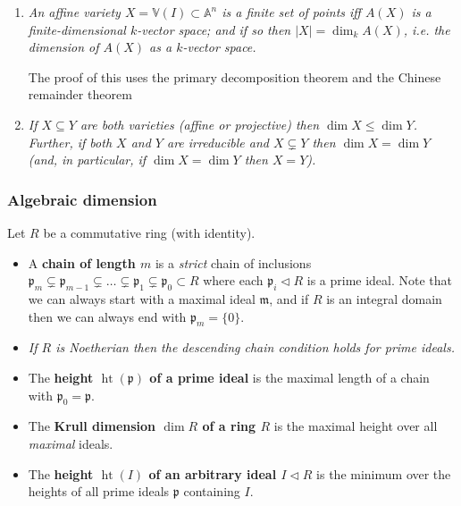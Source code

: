 \documentclass[10pt]{article}
\newcommand{\van}{\mathbb{V}}
\newcommand{\aff}{\mathbb{A}}
\newcommand{\prid}{\mathfrak{p}}
\newcommand{\maid}{\mathfrak{m}}
\DeclareMathOperator{\height}{ht}
\begin{document}
                \begin{enumerate}
                    \item \emph{An affine variety $X=\van(I)\subset\aff^n$ is a finite set of points iff $A(X)$ is a finite-dimensional $k$-vector space; and if so then $|X|=\dim_k A(X)$, i.e. the dimension of $A(X)$ as a $k$-vector space.}

                        The proof of this uses the primary decomposition theorem and the Chinese remainder theorem
                    \item \emph{If $X\subseteq Y$ are both varieties (affine or projective) then $\dim X\leqslant\dim Y$.}
                        \emph{Further, if both $X$ and $Y$ are irreducible and $X\subsetneq Y$ then $\dim X=\dim Y$ (and, in particular, if $\dim X=\dim Y$ then $X=Y$).}
                \end{enumerate}

            \subsubsection{Algebraic dimension}

                Let $R$ be a commutative ring (with identity).

                \begin{itemize}
                    \item A \textbf{chain of length $m$} is a \emph{strict} chain of inclusions $\prid_m\subsetneq\prid_{m-1}\subsetneq\ldots\subsetneq\prid_1\subsetneq\prid_0\subset R$ where each $\prid_i\triangleleft R$ is a prime ideal.
                        Note that we can always start with a maximal ideal $\maid$, and if $R$ is an integral domain then we can always end with $\prid_m=\{0\}$.
                    \item \emph{If $R$ is Noetherian then the descending chain condition holds for \emph{prime} ideals.}
                    \item The \textbf{height $\height(\prid)$ of a prime ideal} is the maximal length of a chain with $\prid_0=\prid$.
                    \item The \textbf{Krull dimension $\dim R$ of a ring $R$} is the maximal height over all \emph{maximal} ideals.
                    \item The \textbf{height $\height(I)$ of an arbitrary ideal $I\triangleleft R$} is the minimum over the heights of all prime ideals $\prid$ containing $I$.
                \end{itemize}
\end{document}
